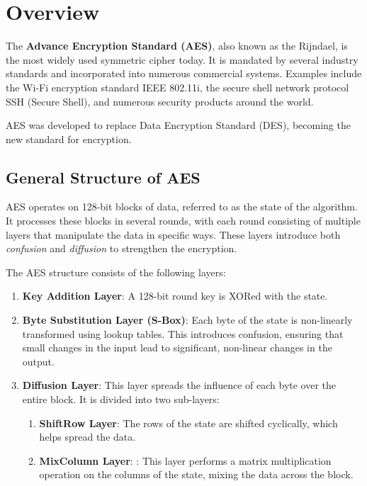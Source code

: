 \section{Overview}

The \textbf{Advance Encryption Standard (AES)}, also known as the Rijndael, is the most widely used symmetric cipher today.
It is mandated by several industry standards and incorporated into numerous commercial systems. 
Examples include the Wi-Fi encryption standard IEEE 802.11i, the secure shell network protocol SSH (Secure Shell), and numerous security products around the world. 

AES was developed to replace Data Encryption Standard (DES), becoming the new standard for encryption.


\subsection{General Structure of AES}

AES operates on 128-bit blocks of data, referred to as the state of the algorithm.
It processes these blocks in several rounds, with each round consisting of multiple layers that manipulate the data in specific ways. 
These layers introduce both \textit{confusion} and \textit{diffusion} to strengthen the encryption.

The AES structure consists of the following layers:
\begin{enumerate}
    \item \textbf{Key Addition Layer}:
    A 128-bit round key is XORed with the state. 

    \item \textbf{Byte Substitution Layer (S-Box)}:
    Each byte of the state is non-linearly transformed using lookup tables. 
    This introduces confusion, ensuring that small changes in the input lead to significant, non-linear changes in the output.
    
    \item \textbf{Diffusion Layer}:
    This layer spreads the influence of each byte over the entire block. 
    It is divided into two sub-layers:
    \begin{enumerate}
        \item \textbf{ShiftRow Layer}: The rows of the state are shifted cyclically, which helps spread the data. %
        \item \textbf{MixColumn Layer}: : This layer performs a matrix multiplication operation on the columns of the state, mixing the data across the block. %
    \end{enumerate}
\end{enumerate}

